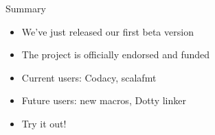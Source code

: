 \documentclass[svgnames,dvipsnames,hyperref={bookmarks=false},usepdftitle=false]{beamer}
\begin{document}

\begin{frame}{Summary}
\begin{itemize}
\item We've just released our first beta version
\item The project is officially endorsed and funded
\item Current users: Codacy, scalafmt
\item Future users: new macros, Dotty linker
\item Try it out!
\end{itemize}
\end{frame}
\end{document}
